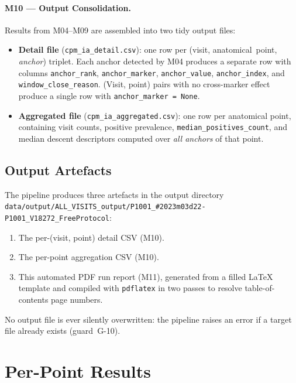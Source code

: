 \documentclass[a4paper,11pt]{article}
\begin{document}
\paragraph{M10 --- Output Consolidation.}
Results from M04--M09 are assembled into two tidy output files:
\begin{itemize}
  \item \textbf{Detail file} (\texttt{cpm\_ia\_detail.csv}): one row per
        (visit, anatomical~point, \emph{anchor}) triplet. Each anchor detected by M04
        produces a separate row with columns \texttt{anchor\_rank},
        \texttt{anchor\_marker}, \texttt{anchor\_value}, \texttt{anchor\_index},
        and \texttt{window\_close\_reason}.
        (Visit, point) pairs with no cross-marker effect produce a single row with
        \texttt{anchor\_marker = None}.
  \item \textbf{Aggregated file} (\texttt{cpm\_ia\_aggregated.csv}): one row per
        anatomical point, containing visit counts, positive prevalence,
        \texttt{median\_positives\_count}, and median descent descriptors computed over
        \emph{all anchors} of that point.
\end{itemize}

\subsection{Output Artefacts}

The pipeline produces three artefacts in the output directory \texttt{data/output/ALL\_VISITS\_output/P1001\_\#2023m03d22-P1001\_V18272\_FreeProtocol}:
\begin{enumerate}
  \item The per-(visit, point) detail CSV (M10).
  \item The per-point aggregation CSV (M10).
  \item This automated PDF run report (M11), generated from a filled \LaTeX{} template
        and compiled with \texttt{pdflatex} in two passes to resolve table-of-contents
        page numbers.
\end{enumerate}
No output file is ever silently overwritten: the pipeline raises an error if a target
file already exists (guard~G-10).

\section{Per-Point Results}
\end{document}
